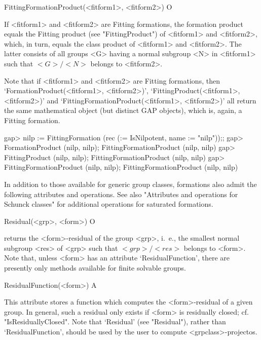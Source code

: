 \>FittingFormationProduct(<fitform1>, <fitform2>) O

If <fitform1> and <fitform2>  are Fitting formations, the formation product
equals the Fitting product (see "FittingProduct") of <fitform1> and
<fitform2>, which, in turn, equals the class product of <fitform1> and
<fitform2>. The latter consists of all groups <G> having a  normal subgroup
<N> in <fitform1> such that $<G>/<N>$ belongs to <fitform2>.

Note that if <fitform1> and <fitform2> are Fitting formations, then 
`FormationProduct(<fitform1>, <fitform2>)', `FittingProduct(<fitform1>,
<fitform2>)' and `FittingFormationProduct(<fitform1>, <fitform2>)' all
return the same mathematical object (but distinct GAP objects), which is,
again, a Fitting formation.


\beginexample
gap> nilp := FittingFormation (rec (\in := IsNilpotent, name := "nilp"));;
gap> FormationProduct (nilp, nilp);
FittingFormationProduct (nilp, nilp)
gap> FittingProduct (nilp, nilp);
FittingFormationProduct (nilp, nilp)
gap> FittingFormationProduct (nilp, nilp);
FittingFormationProduct (nilp, nilp)
\endexample


\null


In addition to those available for generic group classes, formations also
admit the following attributes and operations. See also "Attributes and
operations for Schunck classes" for additional operations for saturated
formations. 

\>Residual(<grp>, <form>) O

returns the <form>-residual of the group <grp>, i.~e., the smallest
normal subgroup <res> of <grp> such that $<grp>/<res>$ belongs to <form>.
Note that, unless <form>
has an attribute `ResidualFunction', there are presently only methods
available for finite solvable groups.

\>ResidualFunction(<form>) A

This attribute stores a function which computes the <form>-residual of a
given group. In general, such a residual only exists if <form> is
residually closed; cf. "IsResiduallyClosed". Note that `Residual' (see "Residual"),
rather than `ResidualFunction', should be used by the user to compute
<grpclass>-projectos.

